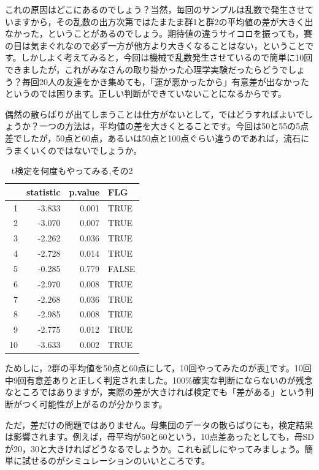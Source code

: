 \documentclass{ltjsarticle}
\begin{document}
これの原因はどこにあるのでしょう？当然，毎回のサンプルは乱数で発生させていますから，その乱数の出方次第ではたまたま群1と群2の平均値の差が大きく出なかった，ということがあるのでしょう。期待値の違うサイコロを振っても，賽の目は気まぐれなので必ず一方が他方より大きくなることはない，ということです。しかしよく考えてみると，今回は機械で乱数発生させているので簡単に10回できましたが，これがみなさんの取り掛かった心理学実験だったらどうでしょう？毎回20人の友達をかき集めても，「運が悪かったから」有意差が出なかったというのでは困ります。正しい判断ができていないことになるからです。

偶然の散らばりが出てしまうことは仕方がないとして，ではどうすればよいでしょうか？一つの方法は，平均値の差を大きくとることです。今回は50と55の5点差でしたが，50点と60点，あるいは50点と100点ぐらい違うのであれば，流石にうまくいくのではないでしょうか。


\begin{table}[ht]
    \centering
    \caption{t検定を何度もやってみる,その2} 
    \begin{tabular}{rrrl}
      \hline
     & statistic & p.value & FLG \\ 
      \hline
    1 & -3.833 & 0.001 & TRUE \\ 
      2 & -3.070 & 0.007 & TRUE \\ 
      3 & -2.262 & 0.036 & TRUE \\ 
      4 & -2.728 & 0.014 & TRUE \\ 
      5 & -0.285 & 0.779 & FALSE \\ 
      6 & -2.970 & 0.008 & TRUE \\ 
      7 & -2.268 & 0.036 & TRUE \\ 
      8 & -2.985 & 0.008 & TRUE \\ 
      9 & -2.775 & 0.012 & TRUE \\ 
      10 & -3.633 & 0.002 & TRUE \\ 
       \hline
    \end{tabular}
    \label{tbl::19_04}
    \end{table}

ためしに，2群の平均値を50点と60点にして，10回やってみたのが表\ref{tbl::19_04}です。10回中9回有意差ありと正しく判定されました。100\%確実な判断にならないのが残念なところではありますが，実際の差が大きければ検定でも「差がある」という判断がつく可能性が上がるのが分かります。

ただ，差だけの問題ではありません。母集団のデータの散らばりにも，検定結果は影響されます。例えば，母平均が50と60という，10点差あったとしても，母SDが20，30と大きければどうなるでしょうか。これも試しにやってみましょう。簡単に試せるのがシミュレーションのいいところです。
\end{document}
